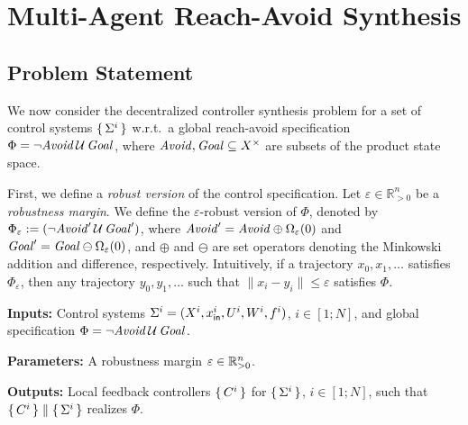 
\section{Multi-Agent Reach-Avoid Synthesis}
\label{sec:problem}

\subsection{Problem Statement}

We now consider the decentralized controller synthesis problem for a set of control systems 
$\set{\Sigma^i}$ w.r.t.\ a global reach-avoid specification $\Phi = \lnot\mathit{Avoid}\, \mathcal{U}\,\mathit{Goal}$,
where $\mathit{Avoid}, \mathit{Goal} \subseteq X^\times$ are subsets of the product state space. 

% 

First, we define a \emph{robust version} of the control specification.
Let $\varepsilon\in \mathbb{R}^n_{>0}$ be a \emph{robustness margin}. 
We define the $\varepsilon$-robust version of $\Phi$, denoted by $\Phi_\varepsilon:=(\lnot\mathit{Avoid}'\,\mathcal{U}\,\mathit{Goal}')$,
where $\mathit{Avoid}'=\mathit{Avoid}\oplus\Omega_\varepsilon(0)$ and 
$\mathit{Goal}'=\mathit{Goal}\ominus\Omega_\varepsilon(0)$, and $\oplus$ and $\ominus$ are set operators denoting the Minkowski addition and difference, respectively. 
Intuitively, if a trajectory $x_0,x_1,\ldots$ satisfies $\Phi_\varepsilon$, then any trajectory $y_0, y_1,\ldots$ such that
$\|x_i - y_i \| \leq \varepsilon$ satisfies $\Phi$.


\begin{resp}
\begin{problem}
\label{problem}
\noindent\textbf{Inputs:} Control systems $\Sigma^i=(X^i,x_{\mathsf{in}}^i,U^i,W^i,f^i)$, $i\in [1;N]$, and global specification $\Phi=\lnot\mathit{Avoid}\,\mathcal{U}\,\mathit{Goal}$.

\noindent\textbf{Parameters:} A robustness margin $\varepsilon\in \mathbb{R}^n_{>0}$.

\noindent\textbf{Outputs:} Local feedback controllers $\set{C^i}$ for $\set{\Sigma^i}$, $i\in [1;N]$, such that $\set{C^i}\parallel \set{\Sigma^i}$ realizes $\Phi$. 
\end{problem}
\end{resp}

